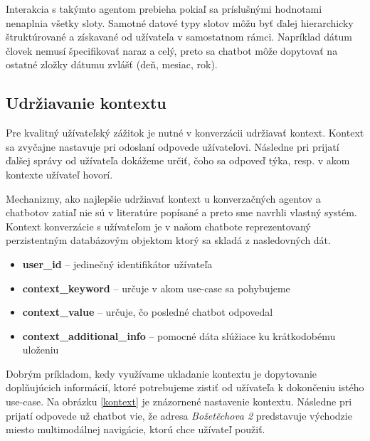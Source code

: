\documentclass{ExcelAtFIT}
\begin{document}
Interakcia s takýmto agentom prebieha pokiaľ sa príslušnými hodnotami nenaplnia všetky sloty. 
Samotné datové typy slotov môžu byť ďalej hierarchicky štruktúrované a získavané od užívateľa v samostatnom rámci. Napríklad dátum človek nemusí špecifikovať naraz a celý, preto sa chatbot môže dopytovať na ostatné zložky dátumu zvlášť (deň, mesiac, rok).

\subsection{Udržiavanie kontextu}

Pre kvalitný užívateľský zážitok je nutné v konverzácii udržiavať kontext. Kontext sa zvyčajne nastavuje pri odoslaní odpovede užívateľovi. Následne pri prijatí ďalšej správy od užívateľa dokážeme určiť, čoho sa odpoveď týka, resp. v akom kontexte užívateľ hovorí.

Mechanizmy, ako najlepšie udržiavať kontext u konverzačných agentov a chatbotov zatiaľ nie sú v literatúre popísané a preto sme navrhli vlastný systém. Kontext konverzácie s užívateľom je v našom chatbote reprezentovaný perzistentným databázovým objektom ktorý sa skladá z nasledovných dát.

\begin{itemize}
    \item \textbf{user\_id} -- jedinečný identifikátor užívateľa
    \item \textbf{context\_keyword} -- určuje v akom use-case sa pohybujeme
    \item \textbf{context\_value} -- určuje, čo posledné chatbot odpovedal
    \item \textbf{context\_additional\_info} -- pomocné dáta slúžiace ku krátkodobému uloženiu
\end{itemize}

Dobrým príkladom, kedy využívame ukladanie kontextu je dopytovanie doplňujúcich informácií, ktoré potrebujeme zistiť od užívateľa k dokončeniu istého use-case.
Na obrázku \ref{kontext} je znázornené nastavenie kontextu. Následne pri prijatí odpovede už chatbot vie, že adresa \emph{Božetěchova 2} predstavuje východzie miesto multimodálnej navigácie, ktorú chce užívateľ použiť.
\end{document}
